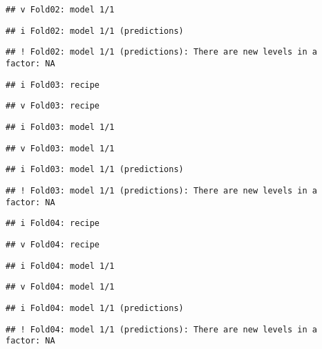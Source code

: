 \documentclass[
]{article}
\begin{document}
\begin{verbatim}
## v Fold02: model 1/1
\end{verbatim}

\begin{verbatim}
## i Fold02: model 1/1 (predictions)
\end{verbatim}

\begin{verbatim}
## ! Fold02: model 1/1 (predictions): There are new levels in a factor: NA
\end{verbatim}

\begin{verbatim}
## i Fold03: recipe
\end{verbatim}

\begin{verbatim}
## v Fold03: recipe
\end{verbatim}

\begin{verbatim}
## i Fold03: model 1/1
\end{verbatim}

\begin{verbatim}
## v Fold03: model 1/1
\end{verbatim}

\begin{verbatim}
## i Fold03: model 1/1 (predictions)
\end{verbatim}

\begin{verbatim}
## ! Fold03: model 1/1 (predictions): There are new levels in a factor: NA
\end{verbatim}

\begin{verbatim}
## i Fold04: recipe
\end{verbatim}

\begin{verbatim}
## v Fold04: recipe
\end{verbatim}

\begin{verbatim}
## i Fold04: model 1/1
\end{verbatim}

\begin{verbatim}
## v Fold04: model 1/1
\end{verbatim}

\begin{verbatim}
## i Fold04: model 1/1 (predictions)
\end{verbatim}

\begin{verbatim}
## ! Fold04: model 1/1 (predictions): There are new levels in a factor: NA
\end{verbatim}
\end{document}

